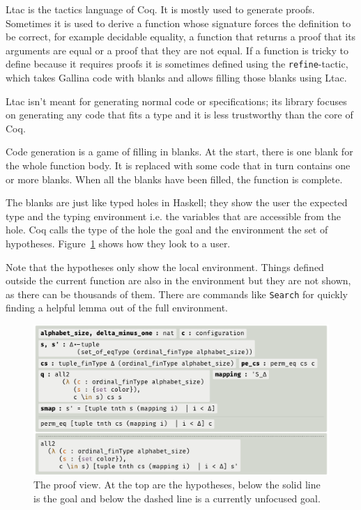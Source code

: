 \documentclass[english, 12pt, a4paper, sci, a-1b, online]{aaltothesis}
\newcommand\icoq[1]{\texttt{#1}}
\begin{document}
Ltac is the tactics language of Coq. It is mostly used to generate proofs. Sometimes it is used to derive a function whose signature forces the definition to be correct, for example decidable equality, a function that returns a proof that its arguments are equal or a proof that they are not equal. If a function is tricky to define because it requires proofs it is sometimes defined using the \icoq{refine}-tactic, which takes Gallina code with blanks and allows filling those blanks using Ltac.

Ltac isn't meant for generating normal code or specifications; its library focuses on generating any code that fits a type and it is less trustworthy than the core of Coq.

Code generation is a game of filling in blanks. At the start, there is one blank for the whole function body. It is replaced with some code that in turn contains one or more blanks. When all the blanks have been filled, the function is complete.

The blanks are just like typed holes in Haskell; they show the user the expected type and the typing environment i.e. the variables that are accessible from the hole. Coq calls the type of the hole the goal and the environment the set of hypotheses. Figure~\ref{proofview} shows how they look to a user.

Note that the hypotheses only show the local environment. Things defined outside the current function are also in the environment but they are not shown, as there can be thousands of them. There are commands like \icoq{Search} for quickly finding a helpful lemma out of the full environment.

\begin{figure}[h]
  \includegraphics[scale=0.7]{proof_view}
  \caption{The proof view. At the top are the hypotheses, below the solid line is the goal and below the dashed line is a currently unfocused goal.}
  \label{proofview}
\end{figure}
\end{document}
